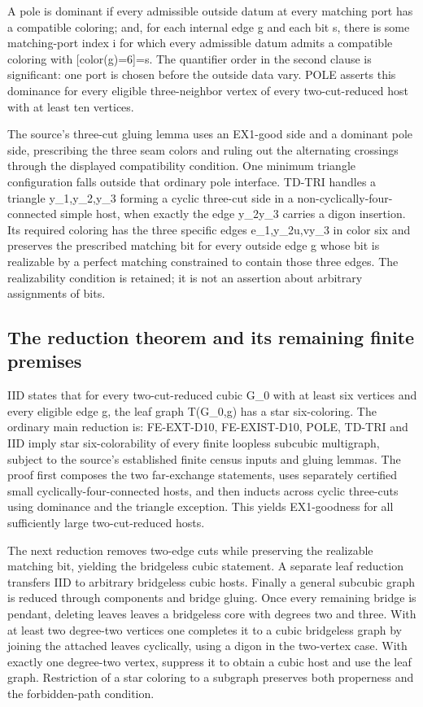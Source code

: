 \documentclass[11pt,a4paper]{article}
\begin{document}
A pole is dominant if every admissible outside datum at every matching port has a compatible coloring; and, for each internal edge g and each bit s, there is some matching-port index i for which every admissible datum admits a compatible coloring with [color(g)=6]=s. The quantifier order in the second clause is significant: one port is chosen before the outside data vary. POLE asserts this dominance for every eligible three-neighbor vertex of every two-cut-reduced host with at least ten vertices.

The source's three-cut gluing lemma uses an EX1-good side and a dominant pole side, prescribing the three seam colors and ruling out the alternating crossings through the displayed compatibility condition. One minimum triangle configuration falls outside that ordinary pole interface. TD-TRI handles a triangle y\_1,y\_2,y\_3 forming a cyclic three-cut side in a non-cyclically-four-connected simple host, when exactly the edge y\_2y\_3 carries a digon insertion. Its required coloring has the three specific edges e\_1,y\_2u,vy\_3 in color six and preserves the prescribed matching bit for every outside edge g whose bit is realizable by a perfect matching constrained to contain those three edges. The realizability condition is retained; it is not an assertion about arbitrary assignments of bits.

\subsection{The reduction theorem and its remaining finite premises}
IID states that for every two-cut-reduced cubic G\_0 with at least six vertices and every eligible edge g, the leaf graph T(G\_0,g) has a star six-coloring. The ordinary main reduction is: FE-EXT-D10, FE-EXIST-D10, POLE, TD-TRI and IID imply star six-colorability of every finite loopless subcubic multigraph, subject to the source's established finite census inputs and gluing lemmas. The proof first composes the two far-exchange statements, uses separately certified small cyclically-four-connected hosts, and then inducts across cyclic three-cuts using dominance and the triangle exception. This yields EX1-goodness for all sufficiently large two-cut-reduced hosts.

The next reduction removes two-edge cuts while preserving the realizable matching bit, yielding the bridgeless cubic statement. A separate leaf reduction transfers IID to arbitrary bridgeless cubic hosts. Finally a general subcubic graph is reduced through components and bridge gluing. Once every remaining bridge is pendant, deleting leaves leaves a bridgeless core with degrees two and three. With at least two degree-two vertices one completes it to a cubic bridgeless graph by joining the attached leaves cyclically, using a digon in the two-vertex case. With exactly one degree-two vertex, suppress it to obtain a cubic host and use the leaf graph. Restriction of a star coloring to a subgraph preserves both properness and the forbidden-path condition.
\end{document}
